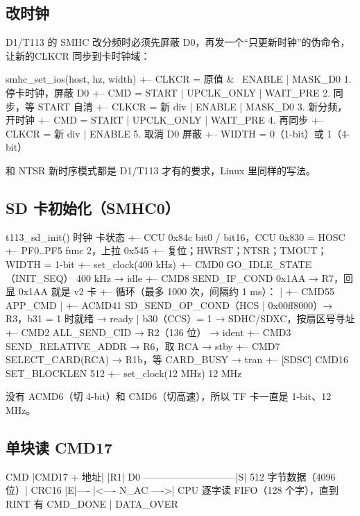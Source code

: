 \subsection{改时钟}

D1/T113 的 SMHC 改分频时必须先屏蔽 D0，再发一个“只更新时钟”的伪命令，让新的CLKCR 同步到卡时钟域：

\begin{txtcode}
smhc_set_ios(host, hz, width)
+-- CLKCR = 原值 & ~ENABLE | MASK_D0       1. 停卡时钟，屏蔽 D0
+-- CMD = START | UPCLK_ONLY | WAIT_PRE    2. 同步，等 START 自清
+-- CLKCR = 新 div | ENABLE | MASK_D0      3. 新分频，开时钟
+-- CMD = START | UPCLK_ONLY | WAIT_PRE    4. 再同步
+-- CLKCR = 新 div | ENABLE                5. 取消 D0 屏蔽
+-- WIDTH = 0（1-bit）或 1（4-bit）
\end{txtcode}

 和 NTSR 新时序模式都是 D1/T113 才有的要求，Linux 里同样的写法。

\subsection{SD 卡初始化（SMHC0）}

\begin{txtcode}
t113_sd_init()                                      时钟      卡状态
+-- CCU 0x84c bit0 / bit16，CCU 0x830 = HOSC
+-- PF0..PF5 func 2，上拉 0x545
+-- 复位；HWRST；NTSR；TMOUT；WIDTH = 1-bit
+-- set_clock(400 kHz)
+-- CMD0  GO_IDLE_STATE（INIT_SEQ）                 400 kHz   → idle
+-- CMD8  SEND_IF_COND 0x1AA → R7，回显 0x1AA 就是 v2 卡
+-- 循环（最多 1000 次，间隔约 1 ms）：
|   +-- CMD55 APP_CMD
|   +-- ACMD41 SD_SEND_OP_COND（HCS | 0x00ff8000）→ R3，b31 = 1 时就绪   → ready
|       b30（CCS）= 1 → SDHC/SDXC，按扇区号寻址
+-- CMD2  ALL_SEND_CID → R2（136 位）                         → ident
+-- CMD3  SEND_RELATIVE_ADDR → R6，取 RCA                     → stby
+-- CMD7  SELECT_CARD(RCA) → R1b，等 CARD_BUSY                → tran
+-- [SDSC] CMD16 SET_BLOCKLEN 512
+-- set_clock(12 MHz)                               12 MHz
\end{txtcode}

没有 ACMD6（切 4-bit）和 CMD6（切高速），所以 TF 卡一直是 1-bit、12 MHz。

\subsection{单块读 CMD17}

\begin{txtcode}[basicstyle=\ttfamily\scriptsize]
CMD   |CMD17 + 地址|   |R1|
D0    -----------------------------|S| 512 字节数据（4096 位）| CRC16 |E|----
                   |<---- N_AC ---->|
CPU                                  逐字读 FIFO（128 个字），直到 RINT 有 CMD_DONE | DATA_OVER
\end{txtcode}

